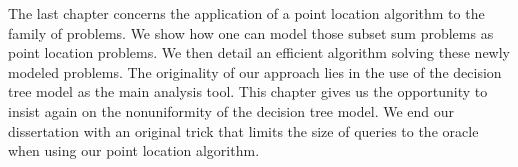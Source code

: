 The last chapter concerns the application of a point location algorithm to the
family of \kSUM problems. We show how one can
model those subset sum problems as point location problems. We then detail an
efficient algorithm \cite{meiser:1993,burgisser:1997} solving these newly modeled problems. The originality of our
approach lies in the use of the decision tree model as the main analysis tool.
This chapter gives us the opportunity to insist again on the
nonuniformity of the decision tree model. We end our dissertation with an
original trick that limits the size of queries to the oracle when using our
point location algorithm.
